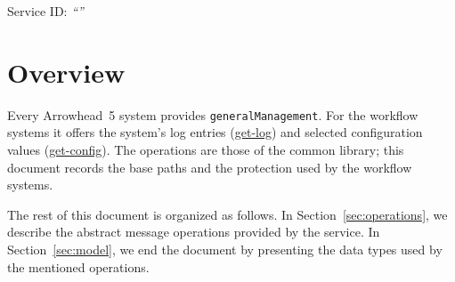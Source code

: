 \documentclass[a4paper]{arrowhead}
\newcommand{\oref}[1]{{\textcolor{ArrowheadBlue}{\hyperref[sec:operations:#1]{#1}}}}
\begin{document}
\ArrowheadSetup

\begin{center}
  \vspace*{1cm}
  \huge{\arrowtitle}

  \vspace*{0.2cm}
  \LARGE{\arrowtype}
  \vspace*{1cm}

  \Large{Service ID: \textit{``\arrowid''}}
  \vspace*{\fill}

  

  \vspace*{1cm}
  \vspace*{\fill}

  \begin{abstract}
    This document describes the \texttt{general\allowbreak{}Management} service of the Eclipse Arrowhead workflow support systems, which gives operators the log and selected configuration of each workflow system. It is provided by each of the three workflow systems, service version 1.0.0, documentation edition 5.4.0.
  \end{abstract}

  \vspace*{1cm}
\end{center}

\newpage

\tableofcontents
\newpage

\section{Overview}
\label{sec:overview}
Every Arrowhead~5 system provides \texttt{general\allowbreak{}Management}. For the workflow systems it offers
the system's log entries (\oref{get-log}) and selected configuration values (\oref{get-config}). The operations are
those of the common library; this document records the base paths and the protection used by the workflow systems.

The rest of this document is organized as follows.
In Section~\ref{sec:operations}, we describe the abstract message operations provided by the service.
In Section~\ref{sec:model}, we end the document by presenting the data types used by the mentioned operations.
\end{document}

